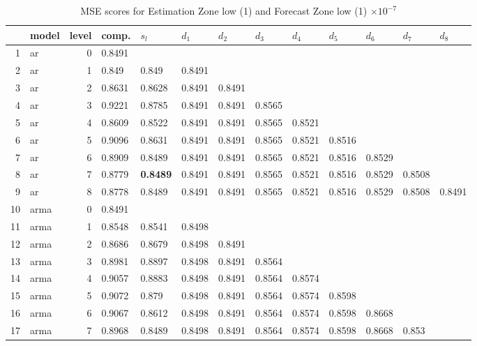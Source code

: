 \documentclass[10pt,a4paper]{article}
\begin{document}
\begin{table}[ht]
\centering
\caption{MSE scores for Estimation Zone low (1) and Forecast Zone low (1) $ \times 10^{-7}$} 
\begin{tabular}{rlrllllllllll}
  \hline
 & model & level & comp. & $s_l$ & $d_1$ & $d_2$ & $d_3$ & $d_4$ & $d_5$ & $d_6$ & $d_7$ & $d_8$ \\ 
  \hline
1 & ar &     0 & 0.8491 &  &  &  &  &  &  &  &  &  \\ 
  2 & ar &     1 & 0.849 & 0.849 & 0.8491 &  &  &  &  &  &  &  \\ 
  3 & ar &     2 & 0.8631 & 0.8628 & 0.8491 & 0.8491 &  &  &  &  &  &  \\ 
  4 & ar &     3 & 0.9221 & 0.8785 & 0.8491 & 0.8491 & 0.8565 &  &  &  &  &  \\ 
  5 & ar &     4 & 0.8609 & 0.8522 & 0.8491 & 0.8491 & 0.8565 & 0.8521 &  &  &  &  \\ 
  6 & ar &     5 & 0.9096 & 0.8631 & 0.8491 & 0.8491 & 0.8565 & 0.8521 & 0.8516 &  &  &  \\ 
  7 & ar &     6 & 0.8909 & 0.8489 & 0.8491 & 0.8491 & 0.8565 & 0.8521 & 0.8516 & 0.8529 &  &  \\ 
  8 & ar &     7 & 0.8779 & \textbf{0.8489} & 0.8491 & 0.8491 & 0.8565 & 0.8521 & 0.8516 & 0.8529 & 0.8508 &  \\ 
  9 & ar &     8 & 0.8778 & 0.8489 & 0.8491 & 0.8491 & 0.8565 & 0.8521 & 0.8516 & 0.8529 & 0.8508 & 0.8491 \\ 
   \hline
10 & arma &     0 & 0.8491 &  &  &  &  &  &  &  &  &  \\ 
  11 & arma &     1 & 0.8548 & 0.8541 & 0.8498 &  &  &  &  &  &  &  \\ 
  12 & arma &     2 & 0.8686 & 0.8679 & 0.8498 & 0.8491 &  &  &  &  &  &  \\ 
  13 & arma &     3 & 0.8981 & 0.8897 & 0.8498 & 0.8491 & 0.8564 &  &  &  &  &  \\ 
  14 & arma &     4 & 0.9057 & 0.8883 & 0.8498 & 0.8491 & 0.8564 & 0.8574 &  &  &  &  \\ 
  15 & arma &     5 & 0.9072 & 0.879 & 0.8498 & 0.8491 & 0.8564 & 0.8574 & 0.8598 &  &  &  \\ 
  16 & arma &     6 & 0.9067 & 0.8612 & 0.8498 & 0.8491 & 0.8564 & 0.8574 & 0.8598 & 0.8668 &  &  \\ 
  17 & arma &     7 & 0.8968 & 0.8489 & 0.8498 & 0.8491 & 0.8564 & 0.8574 & 0.8598 & 0.8668 & 0.853 &  \\ 

\end{tabular}
\end{table}
\end{document}
